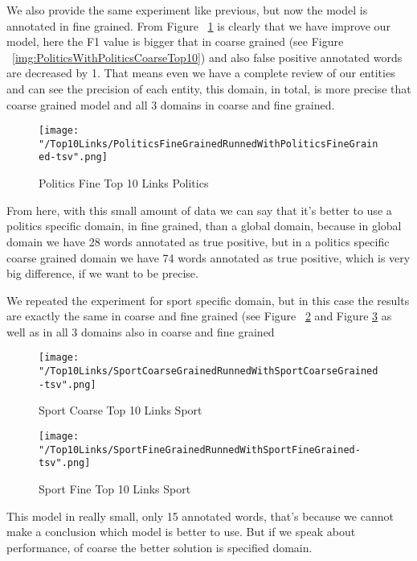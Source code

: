 \documentclass[thesis=M,english]{FITthesis}[2018/05/30]
\begin{document}
	We also provide the same experiment like previous, but now the model is annotated in fine grained. From Figure ~\ref{img:PoliticsWithPoliticsFineTop10} is clearly that we have improve our model, here the F1 value is bigger that in coarse grained (see Figure ~\ref{img:PoliticsWithPoliticsCoarseTop10}) and also false positive annotated words are decreased by 1. That means even we have a complete review of our entities and can see the precision of each entity, this domain, in total, is more precise that coarse grained model and all 3 domains in coarse and fine grained.
	\begin{figure}[H]\centering
		\texttt{[image: "/Top10Links/PoliticsFineGrainedRunnedWithPoliticsFineGrained-tsv".png]}
		\caption{Politics Fine Top 10 Links Politics}\label{img:PoliticsWithPoliticsFineTop10}
	\end{figure}
	From here, with this small amount of data we can say that it's better to use a politics specific domain, in fine grained, than a global domain, because in global domain we have 28 words annotated as true positive, but in a politics specific coarse grained domain we have 74 words annotated as true positive, which is very big difference, if we want to be precise.
	
	
	
	We repeated the experiment for sport specific domain, but in this case the results are exactly the same in coarse and fine grained (see Figure ~\ref{img:SportWithSportCoarseTop10} and Figure \ref{img:SportWithSportFineTop10} as well as in all 3 domains also in coarse and fine grained
	\begin{figure}[H]\centering
		\texttt{[image: "/Top10Links/SportCoarseGrainedRunnedWithSportCoarseGrained-tsv".png]}
		\caption{Sport Coarse Top 10 Links Sport}\label{img:SportWithSportCoarseTop10}
	\end{figure}		
	
	\begin{figure}[H]\centering
		\texttt{[image: "/Top10Links/SportFineGrainedRunnedWithSportFineGrained-tsv".png]}
		\caption{Sport Fine Top 10 Links Sport}\label{img:SportWithSportFineTop10}	
	\end{figure}
	This model in really small, only 15 annotated words, that's because we cannot make a conclusion which model is better to use. But if we speak about performance, of coarse the better solution is specified domain.	
	
\end{document}
